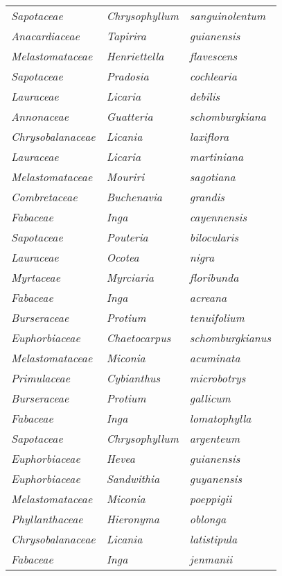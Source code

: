 \documentclass[fleqn,10pt]{ArtEcoFoG} %
\renewenvironment{table}{\begin{table*}}{\end{table*}\ignorespacesafterend}
\begin{document}
\begin{table}
\begin{tabular}[t]{lll}
\em{Sapotaceae} & \em{Chrysophyllum} & \em{sanguinolentum}\\
\em{Anacardiaceae} & \em{Tapirira} & \em{guianensis}\\
\em{Melastomataceae} & \em{Henriettella} & \em{flavescens}\\
\addlinespace
\em{Sapotaceae} & \em{Pradosia} & \em{cochlearia}\\
\em{Lauraceae} & \em{Licaria} & \em{debilis}\\
\em{Annonaceae} & \em{Guatteria} & \em{schomburgkiana}\\
\em{Chrysobalanaceae} & \em{Licania} & \em{laxiflora}\\
\em{Lauraceae} & \em{Licaria} & \em{martiniana}\\
\addlinespace
\em{Melastomataceae} & \em{Mouriri} & \em{sagotiana}\\
\em{Combretaceae} & \em{Buchenavia} & \em{grandis}\\
\em{Fabaceae} & \em{Inga} & \em{cayennensis}\\
\em{Sapotaceae} & \em{Pouteria} & \em{bilocularis}\\
\em{Lauraceae} & \em{Ocotea} & \em{nigra}\\
\addlinespace
\em{Myrtaceae} & \em{Myrciaria} & \em{floribunda}\\
\em{Fabaceae} & \em{Inga} & \em{acreana}\\
\em{Burseraceae} & \em{Protium} & \em{tenuifolium}\\
\em{Euphorbiaceae} & \em{Chaetocarpus} & \em{schomburgkianus}\\
\em{Melastomataceae} & \em{Miconia} & \em{acuminata}\\
\addlinespace
\em{Primulaceae} & \em{Cybianthus} & \em{microbotrys}\\
\em{Burseraceae} & \em{Protium} & \em{gallicum}\\
\em{Fabaceae} & \em{Inga} & \em{lomatophylla}\\
\em{Sapotaceae} & \em{Chrysophyllum} & \em{argenteum}\\
\em{Euphorbiaceae} & \em{Hevea} & \em{guianensis}\\
\addlinespace
\em{Euphorbiaceae} & \em{Sandwithia} & \em{guyanensis}\\
\em{Melastomataceae} & \em{Miconia} & \em{poeppigii}\\
\em{Phyllanthaceae} & \em{Hieronyma} & \em{oblonga}\\
\em{Chrysobalanaceae} & \em{Licania} & \em{latistipula}\\
\em{Fabaceae} & \em{Inga} & \em{jenmanii}\\

\end{tabular}
\end{table}
\end{document}
